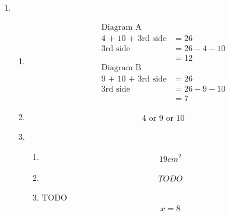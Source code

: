 \documentclass[11pt]{article}
\begin{document}
\begin{enumerate}
    \pagebreak
    \item
        \begin{enumerate}
            \item 
            \begin{equation*}
                \begin{split}
                    \text{Diagram A}\\
                    \text{4 + 10 + 3rd side}&= 26\\
                    \text{3rd side}&=26-4-10\\
                    &=12\\
                    \text{Diagram B}\\
                    \text{9 + 10 + 3rd side}&= 26\\
                    \text{3rd side}&=26-9-10\\
                    &=7
                \end{split}
            \end{equation*}
            
            \item
            \begin{equation*}
                \begin{split}
                    \text{4 or 9 or 10}
                \end{split}
            \end{equation*}

            \item
            \begin{enumerate}
                \item
                \begin{equation*}
                    \begin{split}
                        19cm^2
                    \end{split}
                \end{equation*}
    
                \item
                \begin{equation*}
                    \begin{split}
                        TODO
                    \end{split}
                \end{equation*}
    
                \item TODO
                \begin{equation*}
                    \begin{split}
                        x=8
                    \end{split}
                \end{equation*}
            \end{enumerate}


\end{enumerate}
\end{enumerate}
\end{document}
